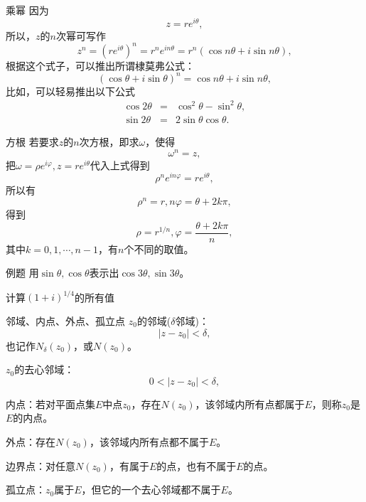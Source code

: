 \documentclass[11pt]{beamer}
\newcommand{\kong}[1][0.5]{\vspace{#1cm}}
\begin{document}
\begin{frame}{乘幂}
因为
\begin{equation}
z = re^{i\theta},
\end{equation}
所以，$z$的$n$次幂可写作
\begin{equation}
z^n = (re^{i\theta})^n = r^n e^{in\theta} = r^n (\cos n\theta + i \sin n \theta),
\end{equation}
根据这个式子，可以推出所谓棣莫弗公式：
\begin{equation}
(\cos \theta + i \sin \theta)^n = \cos n\theta + i \sin n\theta,
\end{equation}
比如，可以轻易推出以下公式
\begin{eqnarray}
\cos 2\theta &=& \cos^2 \theta - \sin^2 \theta,\\
\sin 2 \theta &=& 2 \sin \theta \cos \theta.
\end{eqnarray}
\end{frame}

\begin{frame}{方根}
若要求$z$的$n$次方根，即求$\omega$，使得
\begin{equation}
\omega^n = z,
\end{equation}
把$\omega = \rho e^{i\varphi}, z = r e^{i\theta}$代入上式得到
\begin{equation}
\rho^n e^{in\varphi} = r e^{i\theta},
\end{equation}
所以有
\begin{equation}
\rho^n = r, n\varphi = \theta + 2k\pi,
\end{equation}
得到
\begin{equation}
\rho = r^{1/n}, \varphi = \frac{ \theta + 2k\pi }{n},
\end{equation}
其中$k=0,1,\cdots,n-1$，有$n$个不同的取值。
\end{frame}

\begin{frame}{例题}
用$\sin \theta, \cos \theta$表示出$\cos 3\theta, \sin 3\theta$。

\kong[0.5]

计算$(1+i)^{1/4}$的所有值
\end{frame}

\begin{frame}{邻域、内点、外点、孤立点}
$z_0$的邻域($\delta$邻域)：
\begin{equation}
|z - z_0| < \delta,
\end{equation}
也记作$N_{\delta}(z_0)$，或$N(z_0)$。

\kong[0.5]

$z_0$的去心邻域：
\begin{equation}
0<|z - z_0| < \delta,
\end{equation}

\kong[0.5]
内点：若对平面点集$E$中点$z_0$，存在$N(z_0)$，该邻域内所有点都属于$E$，则称$z_0$是$E$的内点。

\kong[0.5]
外点：存在$N(z_0)$，该邻域内所有点都不属于$E$。

\kong[0.5]
边界点：对任意$N(z_0)$，有属于$E$的点，也有不属于$E$的点。

\kong[0.5]
孤立点：$z_0$属于$E$，但它的一个去心邻域都不属于$E$。

\end{frame}
\end{document}

